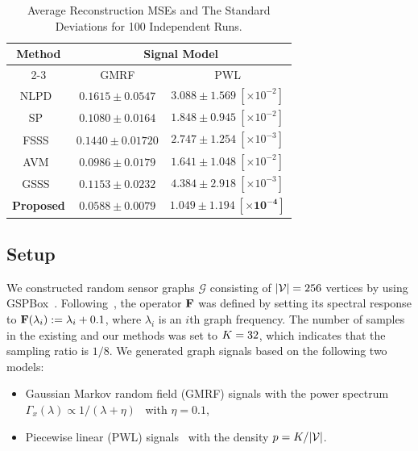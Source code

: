 \documentclass[10pt,journal]{IEEEtran}
\theoremstyle{plain}
\begin{document}
  \begin{table}[t]
  \centering
  \caption{Average Reconstruction MSEs and The Standard Deviations for 100 Independent Runs.}
  \label{msetable}
  \begin{tabular}{ccc}
    \toprule
    Method & \multicolumn{2}{c}{Signal Model} \\
    \cmidrule(lr){2-3}
    & GMRF & PWL  \\
    \midrule
    \vspace{1mm}
    NLPD~\cite{Chen2015Discrete}  
    & $0.1615\pm0.0547$ & $3.088\pm1.569 \: [\times 10^{-2}]$ \\  \vspace{1mm}
    SP~\cite{Anis2016Efficient}  
    & $0.1080\pm0.0164$ & $1.848\pm0.945 \: [\times 10^{-2}]$ \\ \vspace{1mm}
    FSSS~\cite{Sakiyama2019Eigendecomposition}  
    & $0.1440\pm0.01720$ & $2.747\pm1.254 \: [\times 10^{-3}]$ \\   \vspace{1mm}
    AVM~\cite{Jayawant2022Practical}  
    & $0.0986\pm0.0179$ & $1.641\pm1.048 \: [\times 10^{-2}]$ \\ 
    \vspace{1mm}
    GSSS~\cite{Hara2022GSSS}  
    & $0.1153\pm0.0232$ & $4.384\pm2.918 \: [\times 10^{-3}]$ \\  
    \textbf{Proposed}  
    & $\mathbf{0.0588\pm0.0079}$ & $\mathbf{1.049\pm1.194 \: [\times10^{-4}]}$ \\    
    \bottomrule
  \end{tabular}
      \vspace{-3mm}
\end{table}

      \vspace{-4mm}
\subsection{Setup}
We constructed random sensor graphs $\mathcal{G}$ consisting of $|\mathcal{V}| = 256$ vertices by using GSPBox~\cite{perraudin2014gspbox}.
Following~\cite{Tanaka2020GenSamp}, the operator $\mathbf{F}$ was defined by setting its spectral response to 
$\mathbf{F}(\lambda_{i}) := \lambda_{i} + 0.1$,
where $\lambda_{i}$ is an $i$th graph frequency.
The number of samples in the existing and our methods was set to $K = 32$, which indicates that the sampling ratio is $1/8$.
We generated graph signals based on the following two models: 
\begin{itemize}
\item Gaussian Markov random field (GMRF) signals with the power spectrum $\Gamma_x(\lambda) \propto 1/(\lambda + \eta)$~\cite{Gadde2015Probabilistic} with $\eta = 0.1$,
\item Piecewise linear (PWL) signals~\cite{Gadde2014Active} with the density $p = K/|\mathcal{V}|$. 
\end{itemize}
\end{document}

